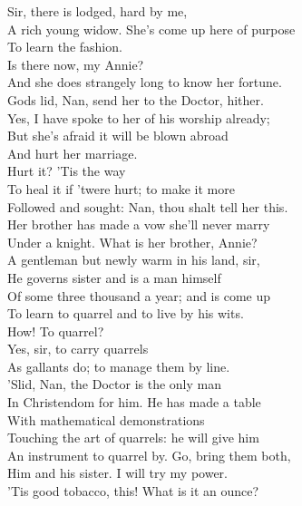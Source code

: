\documentclass[a4paper,oneside,12pt]{memoir}
\begin{document}
\begin{drama*}
\druggerspeaks {} Sir, there is lodged, hard by me,\\
A rich young widow. She's come up here of purpose\\
To learn the fashion.\\
\facespeaks {} Is there now, my Annie?\\
\druggerspeaks And she does strangely long to know her fortune.\\
\facespeaks Gods lid, Nan, send her to the Doctor, hither.\\
\druggerspeaks Yes, I have spoke to her of his worship already;\\
But she's afraid it will be blown abroad\\
And hurt her marriage.\\
\facespeaks {} Hurt it? 'Tis the way\\
To heal it if 'twere hurt; to make it more\\
Followed and sought: Nan, thou shalt tell her this.\\
\druggerspeaks Her brother has made a vow she'll never marry\\
Under a knight.
\facespeaks {} What is her brother, Annie?\\
\druggerspeaks A gentleman but newly warm in his land, sir,\\
He governs sister and is a man himself\\
Of some three thousand a year; and is come up\\
To learn to quarrel and to live by his wits.\\
\facespeaks How! To quarrel?\\
\druggerspeaks {} Yes, sir, to carry quarrels\\
As gallants do; to manage them by line.\\
\facespeaks 'Slid, Nan, the Doctor is the only man\\
In Christendom for him. He has made a table\\
With mathematical demonstrations\\
Touching the art of quarrels: he will give him\\
An instrument to quarrel by. Go, bring them both,\\
Him and his sister.
\druggerspeaks {} I will try my power.\\
\subtlespeaks 'Tis good tobacco, this! What is it an ounce?\\

\end{drama*}
\end{document}
